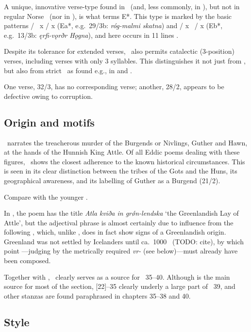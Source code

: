 A unique, innovative verse-type found in \Atlakvida\ (and, less commonly, in ), but not in regular Norse \Fornyrdislag\ (nor in \Beowulf), is what \textcite[83--85]{Goering2023} terms E*.  This type is marked by the basic patterns / \ x / x (Ea*, e.g.~29/3b: \emph{róg-malmi skatna}) and / x \ / x (Eb*, e.g.~13/3b: \emph{ęrfi-vǫrðr Hǫgna}), and here occurs in 11 lines \parencite[83, n.~64]{Goering2023}.

Despite its tolerance for extended verses, \Atlakvida\ also permits catalectic (3-position) verses, including verses with only 3 syllables.  This distinguishes it not just from \Malahattr, but also from strict \Fornyrdislag\ as found e.g., in  and .

One verse, 32/3, has no corresponding verse; another, 28/2, appears to be defective owing to corruption.

\subsection{Origin and motifs}

\Atlakvida\ narrates the treacherous murder of the Burgends or Nivlings, Guther and Hawn, at the hands of the Hunnish King Attle.  Of all Eddic poems dealing with these figures, \Atlakvida\ shows the closest adherence to the known historical circumstances.  This is seen in its clear distinction between the tribes of the Gots and the Huns, its geographical awareness, and its labelling of Guther as a Burgend (21/2).

Compare with the younger .

In \Regius, the poem has the title \emph{Atla kviða in grǿn-lendska} ‘the Greenlandish Lay of Attle’, but the adjectival phrase is almost certainly due to influence from the following , which, unlike \Atlakvida, does in fact show signs of a Greenlandish origin.  Greenland was not settled by Icelanders until ca.~1000 \ce\ (TODO: cite), by which point \Atlakvida---judging by the metrically required \emph{vr-} (see below)---must already have been composed.

Together with , \Atlakvida\ clearly serves as a source for \VolsungaSaga\ 35--40.  Although  is the main source for most of the section, [22]--35 clearly underly a large part of \VolsungaSaga\ 39, and other stanzas are found paraphrased in chapters 35--38 and 40.

\subsection{Style}

